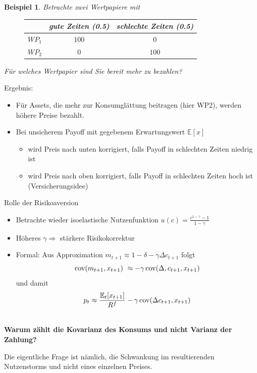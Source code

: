 \documentclass[12pt]{extreport} %
\theoremstyle{named}
\theoremstyle{nnamed}
\theoremstyle{itshape}
\theoremstyle{normal}
\newtheorem*{beispiel}{Beispiel}
\begin{document}
\begin{beispiel}
	Betrachte zwei Wertpapiere mit 
	
	\begin{figure}[h!] \centering
		\begin{tabular}{l|cc}
  			~  & gute Zeiten (0.5) & schlechte Zeiten (0.5) \\
  			\hline
 			$WP_1$ & $100$ & $0$ \\
  			$WP_2$ & $0$ & $100$
		\end{tabular}
	\end{figure} 

	Für welches Wertpapier sind Sie bereit mehr zu bezahlen?	
\end{beispiel}


Ergebnis:
\begin{itemize}
	\item Für Assets, die mehr zur Konsumglättung beitragen (hier WP2), werden höhere Preise bezahlt.
	\item Bei unsicherem Payoff mit gegebenem Erwartungswert $\mathbb{E}[x]$
		\begin{itemize}
			\item wird Preis nach unten korrigiert, falls Payoff in schlechten Zeiten niedrig ist
			\item wird Preis nach oben korrigiert, falls Payoff in schlechten Zeiten hoch ist (Versicherungsidee)
		\end{itemize}
\end{itemize}

Rolle der Risikoaversion
\begin{itemize}
	\item Betrachte wieder isoelastische Nutzenfunktion $u(c) = \frac{c^{1-\gamma} - 1}{1 - \gamma}$
	\item Höheres $\gamma \Rightarrow$ stärkere Risikokorrektur
	\item Formal: Aus Approximation $m_{t+1} \approx 1 - \delta - \gamma \Delta c_{t+1}$ folgt 
		$$ \cov(m_{t+1}, x_{t+1}) \approx - \gamma \cov(\Delta, c_{t+1}, x_{t+1}) $$
		und damit
		$$	p_t \approx \frac{\mathbb{E}_t[x_{t+1}]}{R^f} - \gamma \operatorname{cov}(\Delta c_{t+1}, x_{t+1}) $$
\end{itemize}
 ~\\
\textbf{Warum zählt die Kovarianz des Konsums und nicht Varianz der Zahlung?} \medskip

Die eigentliche Frage ist nämlich, die Schwankung im resultierenden Nutzenstorms und nicht eines einzelnen Preises.
\end{document}

